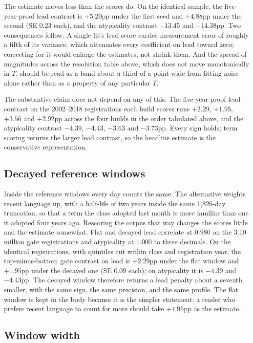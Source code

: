 The estimate moves less than the scores do. On the identical sample, the
five-year-proof lead contrast is $+5.20$pp under the first seed and $+4.88$pp under
the second (SE $0.23$ each), and the atypicality contrast $-13.45$ and
$-14.38$pp. Two consequences follow. A single fit's lead score carries
measurement error of roughly a fifth of its variance, which attenuates every
coefficient on lead toward zero; correcting for it would enlarge the
estimates, not shrink them. And the spread of
magnitudes across the resolution table above, which does not move
monotonically in $T$, should be read as a band about a third of a point wide
from fitting noise alone rather than as a property of any particular $T$.

The substantive claim does not depend on any of this. The five-year-proof
lead contrast on the 2002--2018 registrations each build scores runs
$+2.29$, $+1.95$, $+3.56$ and $+2.92$pp across the four builds in the
order tabulated above, and the atypicality contrast $-4.39$, $-4.43$,
$-3.63$ and $-3.73$pp. Every sign holds; term scoring returns the larger
lead contrast, so the headline estimate is the conservative
representation.

\subsection{Decayed reference windows}\label{sec:robust_decay}

Inside the reference windows every day counts the same. The alternative
weights recent language up, with a half-life of two years inside the same
1,826-day truncation, so that a term the class adopted last month is more
familiar than one it adopted four years ago. Rescoring the corpus that way
changes the scores little and the estimate somewhat. Flat and decayed lead
correlate at $0.980$ on the 3.10 million gate registrations and atypicality
at $1.000$ to three decimals. On the identical registrations, with quintiles
cut within class and registration year, the top-minus-bottom gate contrast
on lead is $+2.29$pp under the flat window and $+1.95$pp under the decayed
one (SE $0.09$ each); on atypicality it is $-4.39$ and $-4.43$pp. The
decayed window therefore returns a lead penalty about a seventh smaller,
with the same sign, the same precision, and the same profile. The flat
window is kept in the body because it is the simpler statement; a reader who
prefers recent language to count for more should take $+1.95$pp as the
estimate.

\subsection{Window width}\label{app:wsweep}

